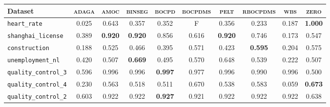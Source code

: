 \begin{tabular}{lccccccccc}
Dataset & \textsc{adaga} & \textsc{amoc} & \textsc{binseg} & \textsc{bocpd} & \textsc{bocpdms} & \textsc{pelt} & \textsc{rbocpdms} & \textsc{wbs} & \textsc{zero}\\
\toprule
\verb+heart_rate+ & 0.025 & 0.643 & 0.357 & 0.352 & F & 0.356 & 0.233 & 0.187 & \textbf{1.000}\\
\verb+shanghai_license+ & 0.389 & \textbf{0.920} & \textbf{0.920} & 0.856 & 0.616 & \textbf{0.920} & 0.746 & 0.173 & 0.547\\
\verb+construction+ & 0.188 & 0.525 & 0.466 & 0.395 & 0.571 & 0.423 & \textbf{0.595} & 0.204 & 0.575\\
\verb+unemployment_nl+ & 0.420 & 0.507 & \textbf{0.669} & 0.495 & 0.570 & 0.648 & 0.539 & 0.222 & 0.507\\
\verb+quality_control_3+ & 0.596 & 0.996 & 0.996 & \textbf{0.997} & 0.977 & 0.996 & 0.990 & 0.996 & 0.500\\
\verb+quality_control_4+ & 0.230 & 0.563 & 0.518 & 0.511 & 0.670 & 0.538 & 0.583 & 0.059 & \textbf{0.673}\\
\midrule
\verb+quality_control_2+ & 0.603 & 0.922 & 0.922 & \textbf{0.927} & 0.921 & 0.922 & 0.922 & 0.922 & 0.638\\
\bottomrule
\end{tabular}
